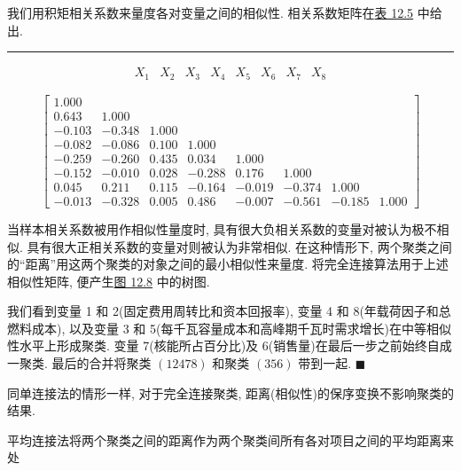 \noindent 我们用积矩相关系数来量度各对变量之间的相似性. 相关系数矩阵在\hyperref[tab:12.5]{表 12.5} 中给出.

\begin{mvtable}
\label{tab:12.5}

\noindent\rule{\linewidth}{0.4pt}

\vspace{0.4em}
\[
\begin{array}{cccccccc}
X_1 & X_2 & X_3 & X_4 & X_5 & X_6 & X_7 & X_8
\end{array}
\]

\vspace{-1.0em}
\[
\begin{bmatrix}
1.000 & & & & & & & \\
0.643 & 1.000 & & & & & & \\
-0.103 & -0.348 & 1.000 & & & & &\\
-0.082 & -0.086 & 0.100 & 1.000 & & & &\\
-0.259 & -0.260 & 0.435 & 0.034 & 1.000 & & &\\
-0.152 & -0.010 & 0.028 & -0.288 & 0.176 & 1.000 & &\\
0.045 & 0.211 & 0.115 & -0.164 & -0.019 & -0.374 & 1.000 &\\
-0.013 & -0.328 & 0.005 & 0.486 & -0.007 & -0.561 & -0.185 & 1.000
\end{bmatrix}
\]
\end{mvtable}

\noindent 当样本相关系数被用作相似性量度时, 具有很大负相关系数的变量对被认为极不相似.
具有很大正相关系数的变量对则被认为非常相似. 在这种情形下, 两个聚类之间的“距离”用这两个聚类的对象之间的最小相似性来量度.
将完全连接算法用于上述相似性矩阵, 便产生\hyperref[fig:12.8]{图 12.8} 中的树图.

我们看到变量 1 和 2(固定费用周转比和资本回报率), 变量 4 和 8(年载荷因子和总燃料成本), 以及变量 3 和 5(每千瓦容量成本和高峰期千瓦时需求增长)在中等相似性水平上形成聚类.
变量 7(核能所占百分比)及 6(销售量)在最后一步之前始终自成一聚类. 最后的合并将聚类 $(12478)$ 和聚类 $(356)$ 带到一起. \hfill$\blacksquare$

\noindent 同单连接法的情形一样, 对于完全连接聚类, 距离(相似性)的保序变换不影响聚类的结果.


平均连接法将两个聚类之间的距离作为两个聚类间所有各对项目之间的平均距离来处
